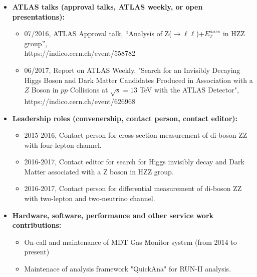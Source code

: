 \begin{itemize}
\item \textbf{ATLAS talks (approval talks, ATLAS weekly, or open presentations):}

    \begin{itemize}
        \item 07/2016, ATLAS Approval talk, ``Analysis of Z($\to\ell\ell$)+$E_{T}^{miss}$ in HZZ group'',\\
              https://indico.cern.ch/event/558782
        \item 06/2017, Report on ATLAS Weekly, "Search for an Invisibly Decaying Higgs Boson and Dark Matter 
              Candidates Produced in Association with a $Z$ Boson in $pp$ Collisions at $\sqrt{s}=13$ TeV 
              with the ATLAS Detector", https://indico.cern.ch/event/626968 
    \end{itemize}

\item \textbf{Leadership roles (convenership, contact person, contact editor):}

    \begin{itemize}
        \item 2015-2016, Contact person for cross section measurement of di-boson ZZ with four-lepton channel. 
        \item 2016-2017, Contact editor for search for Higgs invisibly decay and Dark Matter associated with a Z boson in HZZ group.
        \item 2016-2017, Contact person for differential measurement of di-boson ZZ with two-lepton and two-neutrino channel.
    \end{itemize}

\item \textbf{Hardware, software, performance and other service work contributions:}
        \begin{itemize}
            \item On-call and maintenance of MDT Gas Monitor system (from 2014 to present)
            \item Maintenace of analysis framework "QuickAna" for RUN-II analysis. 
        \end{itemize}



\end{itemize}

